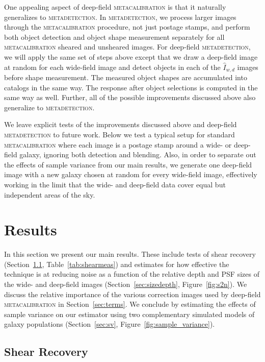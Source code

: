 \documentclass[twocolumn]{openjournal}
\makeatletter
\newcommand{\mdet}{\textsc{metadetection}\@\xspace}
\newcommand{\mcal}{\textsc{metacalibration}\@\xspace}
\makeatother
\begin{document}
One appealing aspect of deep-field \mcal is that it naturally generalizes to
\mdet. In \mdet, we process larger images through the \mcal procedure, not
just postage stamps, and perform both object
detection and object shape measurement separately for all \mcal sheared
and unsheared images.
For deep-field \mdet, we will apply the
same set of steps above except that we draw a deep-field image at random for each
wide-field image and detect objects in each of the $\hat I_{w,d}$ images before shape
measurement. The measured object shapes are accumulated into catalogs in the same way.
The response after object selections is computed in the same way as well. Further, all
of the possible improvements discussed above also generalize to \mdet.

We leave explicit tests of the improvements discussed above and deep-field \mdet to
future work. Below we test a typical setup for standard \mcal where each image is a
postage stamp around a wide- or deep-field galaxy, ignoring both detection and blending.
Also, in order to separate out the effects of sample variance from our main results,
we generate one deep-field image with a new galaxy chosen at random for every wide-field
image, effectively working in the limit that the wide- and deep-field data cover
equal but independent areas of the sky.


\section{Results}\label{sec:results}

In this section we present our main results. These include tests of shear recovery
(Section~\ref{sec:mc}, Table~\ref{tab:shearmeas}) and estimates for how effective the
technique is at reducing noise as a function of the relative depth and PSF sizes of the wide- and
deep-field images (Section~\ref{sec:sizedepth}, Figure~\ref{fig:s2n}). We discuss the
relative importance of the various correction images used by deep-field \mcal in
Section~\ref{sec:terms}. We conclude by estimating the effects of sample variance on our
estimator using two complementary simulated models of galaxy populations
(Section~\ref{sec:sv}, Figure~\ref{fig:sample_variance}).


\subsection{Shear Recovery}\label{sec:mc}
\end{document}
